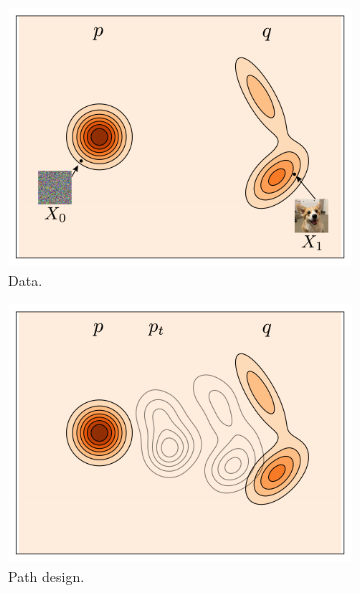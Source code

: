 \documentclass{fairmeta}
\numberwithin{equation}{section}
\begin{document}
\begin{figure}
\centering
\begin{subfigure}[b]{0.24\textwidth}
\includegraphics[width=\textwidth]{assets/recepie/data.pdf}
\caption{Data.}
\label{fig:blueprint:data}
\end{subfigure}
\hfill
\begin{subfigure}[b]{0.24\textwidth}
\includegraphics[width=\textwidth]{assets/recepie/p_t.pdf}
\caption{Path design.}
\label{fig:blueprint:path}
\end{subfigure}
\hfill
\begin{subfigure}[b]{0.24\textwidth}

\end{subfigure}
\end{figure}
\end{document}
